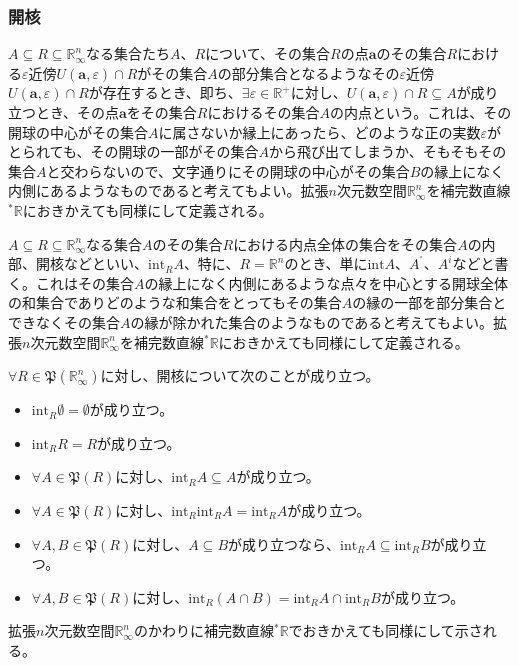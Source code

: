\documentclass[dvipdfmx]{jsarticle}
\begin{document}
\subsubsection{開核}%
\begin{dfn}
$A \subseteq R \subseteq \mathbb{R}_{\infty}^{n}$なる集合たち$A$、$R$について、その集合$R$の点$\mathbf{a}$のその集合$R$における$\varepsilon$近傍$U\left( \mathbf{a},\varepsilon \right) \cap R$がその集合$A$の部分集合となるようなその$\varepsilon$近傍$U\left( \mathbf{a},\varepsilon \right) \cap R$が存在するとき、即ち、$\exists\varepsilon \in \mathbb{R}^{+}$に対し、$U\left( \mathbf{a},\varepsilon \right) \cap R \subseteq A$が成り立つとき、その点$\mathbf{a}$をその集合$R$におけるその集合$A$の内点という。これは、その開球の中心がその集合$A$に属さないか縁上にあったら、どのような正の実数$\varepsilon$がとられても、その開球の一部がその集合$A$から飛び出てしまうか、そもそもその集合$A$と交わらないので、文字通りにその開球の中心がその集合$B$の縁上になく内側にあるようなものであると考えてもよい。拡張$n$次元数空間$\mathbb{R}_{\infty}^{n}$を補完数直線${}^{*}\mathbb{R}$におきかえても同様にして定義される。
\end{dfn}
\begin{dfn}
$A \subseteq R \subseteq \mathbb{R}_{\infty}^{n}$なる集合$A$のその集合$R$における内点全体の集合をその集合$A$の内部、開核などといい、$\mathrm{int}_{R}A$、特に、$R = \mathbb{R}^{n}$のとき、単に$\mathrm{int}A$、$A^{{^\circ}}$、$A^{i}$などと書く。これはその集合$A$の縁上になく内側にあるような点々を中心とする開球全体の和集合でありどのような和集合をとってもその集合$A$の縁の一部を部分集合とできなくその集合$A$の縁が除かれた集合のようなものであると考えてもよい。拡張$n$次元数空間$\mathbb{R}_{\infty}^{n}$を補完数直線${}^{*}\mathbb{R}$におきかえても同様にして定義される。
\end{dfn}
\begin{thm}\label{4.1.3.8}
$\forall R \in \mathfrak{P}\left( \mathbb{R}_{\infty}^{n} \right)$に対し、開核について次のことが成り立つ。
\begin{itemize}
\item
  $\mathrm{int}_{R}\emptyset = \emptyset$が成り立つ。
\item
  $\mathrm{int}_{R}R = R$が成り立つ。
\item
  $\forall A \in \mathfrak{P}(R)$に対し、$\mathrm{int}_{R}A \subseteq A$が成り立つ。
\item
  $\forall A \in \mathfrak{P}(R)$に対し、$\mathrm{int}_{R}{\mathrm{int}_{R}A} = \mathrm{int}_{R}A$が成り立つ。
\item
  $\forall A,B \in \mathfrak{P}(R)$に対し、$A \subseteq B$が成り立つなら、$\mathrm{int}_{R}A \subseteq \mathrm{int}_{R}B$が成り立つ。
\item
  $\forall A,B \in \mathfrak{P}(R)$に対し、$\mathrm{int}_{R}(A \cap B) = \mathrm{int}_{R}A \cap \mathrm{int}_{R}B$が成り立つ。
\end{itemize}
拡張$n$次元数空間$\mathbb{R}_{\infty}^{n}$のかわりに補完数直線${}^{*}\mathbb{R}$でおきかえても同様にして示される。
\end{thm}
\end{document}
